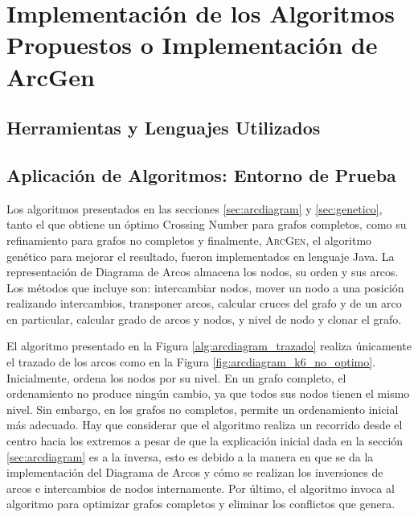 \chapter{Implementación de los Algoritmos Propuestos o  Implementación de ArcGen}\label{cap4}

\section{Herramientas y Lenguajes Utilizados}

\section{Aplicación de Algoritmos: Entorno de Prueba}
Los algoritmos presentados en las secciones \ref{sec:arcdiagram} y \ref{sec:genetico}, tanto el que obtiene un óptimo Crossing Number para grafos completos, como su refinamiento para grafos no completos y finalmente, \textsc{ArcGen}, el algoritmo genético para mejorar el resultado, fueron implementados en lenguaje Java. %
	La  representación de Diagrama de Arcos %
	almacena los nodos, su orden y sus arcos. Los métodos que incluye son: intercambiar nodos, mover un nodo a una posición realizando intercambios, transponer arcos, calcular cruces del grafo y de un arco en particular, calcular grado de arcos y nodos, y nivel de nodo y clonar el grafo.
	
    El algoritmo presentado en la Figura \ref{alg:arcdiagram_trazado}  realiza únicamente el trazado de los arcos como en la Figura \ref{fig:arcdiagram_k6_no_optimo}. Inicialmente,  ordena los nodos por su nivel. En  un grafo completo, el ordenamiento no produce ningún cambio, ya que todos sus nodos tienen el mismo nivel. Sin embargo, en los grafos no completos, permite un ordenamiento inicial más adecuado. Hay que considerar que el algoritmo realiza un recorrido desde el centro hacia los extremos a pesar de que la explicación inicial dada en la sección \ref{sec:arcdiagram} es a la inversa, esto es debido a la manera en que se da la implementación del Diagrama de Arcos y cómo se realizan los inversiones de arcos e intercambios de nodos internamente.
	Por último, el algoritmo invoca al algoritmo para optimizar grafos completos y eliminar los conflictos que genera.
	
